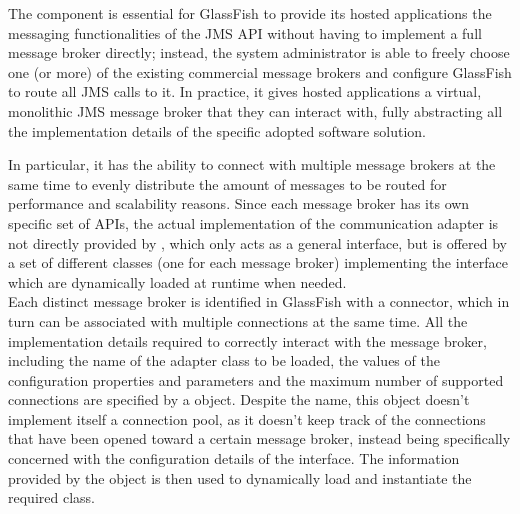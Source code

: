 The  component is essential for GlassFish to provide its hosted applications the messaging functionalities of the JMS API without having to implement a full message broker directly; instead, the system administrator is able to freely choose one (or more) of the existing commercial message brokers and configure GlassFish to route all JMS calls to it. In practice, it gives hosted applications a virtual, monolithic JMS message broker that they can interact with, fully abstracting all the implementation details of the specific adopted software solution.

In particular, it has the ability to connect with multiple message brokers at the same time to evenly distribute the amount of messages to be routed for performance and scalability reasons. Since each message broker has its own specific set of APIs, the actual implementation of the communication adapter is not directly provided by , which only acts as a general interface, but is offered by a set of different classes (one for each message broker) implementing the  interface which are dynamically loaded at runtime when needed.\\

Each distinct message broker is identified in GlassFish with a connector, which in turn can be associated with multiple connections at the same time. All the implementation details required to correctly interact with the message broker, including the name of the adapter class to be loaded, the values of the configuration properties and parameters and the maximum number of supported connections are specified by a  object. Despite the name, this object doesn't implement itself a connection pool, as it doesn't keep track of the connections that have been opened toward a certain message broker, instead being specifically concerned with the configuration details of the interface. The information provided by the  object is then used to dynamically load and instantiate the required  class.\\

